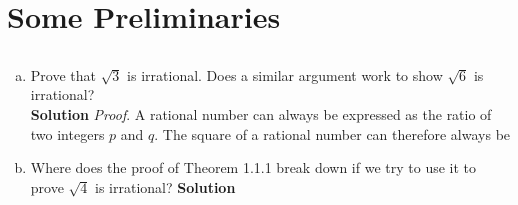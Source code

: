 \documentclass[../Exercises.tex]{subfiles}
\begin{document}
	\setcounter{section}{1}
	\section{Some Preliminaries}
		\subsection{}
			\begin{enumerate}[(a)]
				\item
					Prove that $\sqrt{3}$ is irrational. Does a similar argument work to show $\sqrt{6}$ is irrational? \\
					\subitem \textbf{Solution}
					\subitem
						\emph{Proof}. A rational number can always be expressed as the ratio of two integers $p$ and $q$. The square of a rational number can therefore always be
				\item
					Where does the proof of Theorem 1.1.1 break down if we try to use it to prove $\sqrt{4}$ is irrational?
					\subitem \textbf{Solution}
					\subitem
						
			\end{enumerate}
\end{document}
